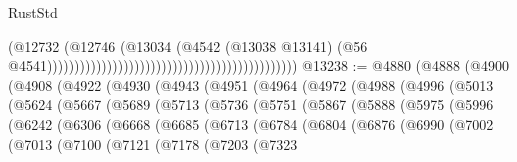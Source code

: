 \begin{lexlean}{RustStd}
\begin{coremodule}
                                                                                      (@12732
                                                                                        (@12746
                                                                                          (@13034
                                                                                            (@4542
                                                                                              (@13038
                                                                                                @13141)
                                                                                              (@56
                                                                                                @4541))))))))))))))))))))))))))))))))))))))))))))))
@13238 := @4880
    (@4888
      (@4900
        (@4908
          (@4922
            (@4930
              (@4943
                (@4951
                  (@4964
                    (@4972
                      (@4988
                        (@4996
                          (@5013
                            (@5624
                              (@5667
                                (@5689
                                  (@5713
                                    (@5736
                                      (@5751
                                        (@5867
                                          (@5888
                                            (@5975
                                              (@5996
                                                (@6242
                                                  (@6306
                                                    (@6668
                                                      (@6685
                                                        (@6713
                                                          (@6784
                                                            (@6804
                                                              (@6876
                                                                (@6990
                                                                  (@7002
                                                                    (@7013
                                                                      (@7100
                                                                        (@7121
                                                                          (@7178
                                                                            (@7203
                                                                              (@7323

\end{coremodule}
\end{lexlean}
